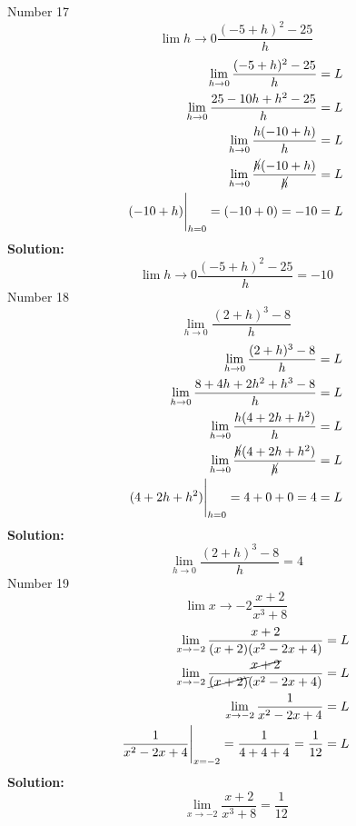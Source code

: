 \documentclass{article}
\begin{document}
	Number 17
	\begin{equation*}
		\lim\limits{h\to 0}\frac{(-5+h)^2-25}{h}
	\end{equation*}
	\begin{eqnarray*}
		\lim\limits_{h\to 0}\frac{(-5+h)^2-25}{h} &= L \\
		\lim\limits_{h\to 0}\frac{25-10h+h^2-25}{h} &= L\\
		\lim\limits_{h\to 0}\frac{h(-10+h)}{h} &= L \\
		\lim\limits_{h\to 0}\frac{\cancel{h}(-10+h)}{\cancel{h}} &= L \\
		(-10+h)\Bigg\vert_{h=0} = (-10+0) = -10 &= L
	\end{eqnarray*}
	\textbf{Solution:}
	\begin{equation*}
		\lim\limits{h\to 0}\frac{(-5+h)^2-25}{h} = -10
	\end{equation*}
	Number 18
	\begin{equation*}
		\lim\limits_{h\to 0}\frac{(2+h)^3-8}{h}
	\end{equation*}
	\begin{eqnarray*}
		\lim\limits_{h\to 0}\frac{(2+h)^3-8}{h} &= L \\
		\lim\limits_{h\to 0}\frac{8+4h+2h^2+h^3-8}{h} &= L\\
		\lim\limits_{h\to 0}\frac{h(4+2h+h^2)}{h} &= L\\
		\lim\limits_{h\to 0}\frac{\cancel{h}(4+2h+h^2)}{\cancel{h}} &= L \\
		(4+2h+h^2)\Bigg\vert_{h=0} = 4+0+0= 4 &= L
	\end{eqnarray*}
	\textbf{Solution:}
	\begin{equation*}
		\lim\limits_{h\to 0}\frac{(2+h)^3-8}{h} = 4
	\end{equation*}
	Number 19
	\begin{equation*}
		\lim\limits{x\to-2}{\frac{x+2}{x^3+8}}
	\end{equation*}
	\begin{eqnarray*}
		\lim\limits_{x\to-2}{\frac{x+2}{(x+2)(x^2-2x+4)}}&=L\\
			\lim\limits_{x\to-2}{\frac{\cancel{x+2}}{\cancel{(x+2)}(x^2-2x+4)}} &= L \\
			\lim\limits_{x\to-2}{\frac{1}{x^2-2x+4}} &=L \\
			\frac{1}{x^2-2x+4}\Bigg\vert_{x=-2}=\frac{1}{4+4+4}=\frac{1}{12}&=L
	\end{eqnarray*}
	\textbf{Solution:}
	\begin{equation*}
		\lim\limits_{x\to-2}{\frac{x+2}{x^3+8}} = \frac{1}{12}
	\end{equation*}
\end{document}
